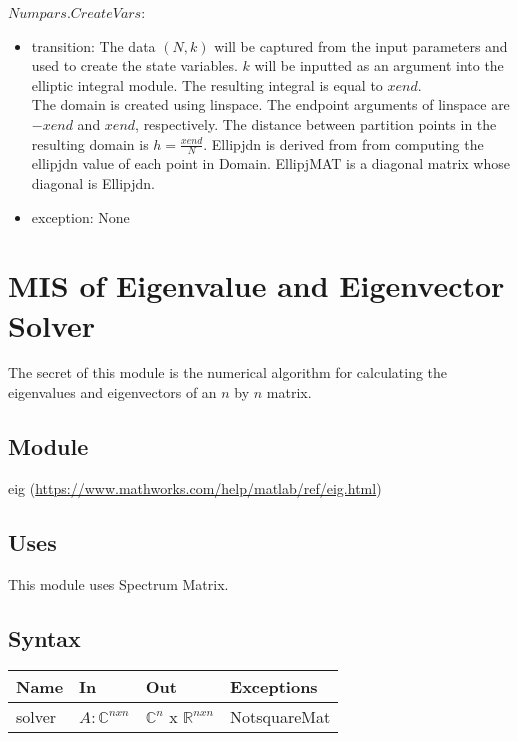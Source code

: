 \documentclass[12pt, titlepage]{article}
\begin{document}
\noindent $Numpars.CreateVars$:
\begin{itemize}
	\item transition: The data $(N,k)$ will be captured from the input 
	parameters and used to create the state variables. $k$ will be inputted as 
	an argument into the elliptic integral module. The resulting integral is 
	equal to $xend$. \\ 
	The domain is created using linspace. The endpoint arguments of linspace 
	are $-xend$ and $xend$, respectively. The distance between partition points 
	in the resulting domain is $h=\frac{xend}{N}$. Ellipjdn is derived from 
	from computing the ellipjdn value of each point in Domain. EllipjMAT is a 
	diagonal matrix whose diagonal is Ellipjdn. 
	\item exception: None
\end{itemize}

\newpage

\section{MIS of Eigenvalue and Eigenvector Solver} 

The secret of this module is the numerical algorithm for calculating the 
eigenvalues and eigenvectors of an $n$ by $n$ matrix.

\subsection{Module}

eig (\url{https://www.mathworks.com/help/matlab/ref/eig.html})

\subsection{Uses}

This module uses Spectrum Matrix. 

\subsection{Syntax}

\begin{center}
	\begin{tabular}{p{2cm} p{4cm} p{4cm} p{4cm}}
		\hline
		\textbf{Name} & \textbf{In} & \textbf{Out} & \textbf{Exceptions} \\
		\hline
		solver & $A : \mathbb{C}^{nxn}$  & 
		$\mathbb{C}^{n}$ x $\mathbb{R}^{nxn}$ & NotsquareMat \\
		\hline
	\end{tabular}
\end{center}
\end{document}

